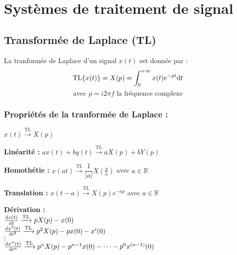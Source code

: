 \documentclass[a4paper,12pt]{report}
\begin{document}
\begin{figure}[!htbp]
	\centering
\end{figure}

\chapter{Systèmes de traitement de signal}

\section{Transformée de Laplace (TL)}

\begin{defi}
    La tranformée de Laplace d'un signal $x(t)$ est donnée par :
    \[ \mathrm{TL} \{ x(t) \} = X(p) = \int_0^{+\infty} x(t) e^{-pt} \mathrm{d}t \]
    \[ \text{avec } p=i2\pi f \text{ la fréquence complexe} \]
\end{defi}

\subsection{Propriétés de la tranformée de Laplace :}

$x(t) \xrightarrow{\mathrm{TL}} X(p)$

\textbf{Linéarité :} $ax(t) + by(t) \xrightarrow{\mathrm{TL}} aX(p) + bY(p)$

\textbf{Homothétie :} $x(at) \xrightarrow{\mathrm{TL}} \dfrac{1}{|a|} X(\frac{p}{a})$ avec $a \in \mathbb{R}$

\textbf{Translation :} $x(t-a) \xrightarrow{\mathrm{TL}} X(p) e^{-ap}$ avec $a \in \mathbb{R}$

\textbf{Dérivation :} \\
$\frac{\mathrm{d}x(t)}{\mathrm{d}t} \xrightarrow{\mathrm{TL}} pX(p) - x(0)$ \\
$\frac{\mathrm{d}x^2(t)}{\mathrm{d}t^2} \xrightarrow{\mathrm{TL}} p^2X(p) - px(0) - x'(0)$ \\
$\vdots$ \\
$\frac{\mathrm{d}x^n(t)}{\mathrm{d}t^n} \xrightarrow{\mathrm{TL}} p^nX(p) - p^{n-1}x(0) - \dots - p^0 x^{(n-1)}(0)$
\end{document}
